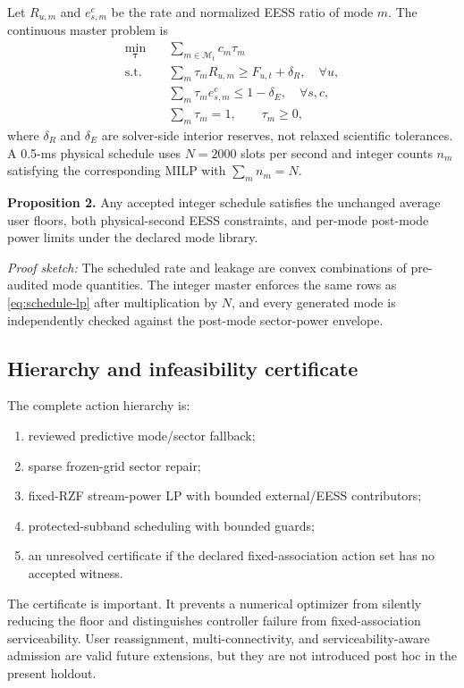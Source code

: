 \documentclass[journal]{IEEEtran}
\newcommand{\M}{\mathcal{M}}
\begin{document}
Let $R_{u,m}$ and $e^{c}_{s,m}$ be the rate and normalized EESS ratio of mode $m$. The continuous master problem is
\begin{subequations}
\begin{align}
 \min_{\bm\tau}\quad &\sum_{m\in\M_t}c_m\tau_m\\
 \text{s.t.}\quad
 &\sum_m\tau_m R_{u,m}\ge F_{u,t}+\delta_R,\quad \forall u,\\
 &\sum_m\tau_m e^{c}_{s,m}\le 1-\delta_E,\quad \forall s,c,\\
 &\sum_m\tau_m=1,\qquad \tau_m\ge0,
\end{align}
\label{eq:schedule-lp}
\end{subequations}
where $\delta_R$ and $\delta_E$ are solver-side interior reserves, not relaxed scientific tolerances. A 0.5-ms physical schedule uses $N=2000$ slots per second and integer counts $n_m$ satisfying the corresponding MILP with $\sum_m n_m=N$.

\textbf{Proposition 2.} Any accepted integer schedule satisfies the unchanged average user floors, both physical-second EESS constraints, and per-mode post-mode power limits under the declared mode library.

\emph{Proof sketch:} The scheduled rate and leakage are convex combinations of pre-audited mode quantities. The integer master enforces the same rows as \eqref{eq:schedule-lp} after multiplication by $N$, and every generated mode is independently checked against the post-mode sector-power envelope.

\subsection{Hierarchy and infeasibility certificate}
The complete action hierarchy is:
\begin{enumerate}
\item reviewed predictive mode/sector fallback;
\item sparse frozen-grid sector repair;
\item fixed-RZF stream-power LP with bounded external/EESS contributors;
\item protected-subband scheduling with bounded guards;
\item an unresolved certificate if the declared fixed-association action set has no accepted witness.
\end{enumerate}
The certificate is important. It prevents a numerical optimizer from silently reducing the floor and distinguishes controller failure from fixed-association serviceability. User reassignment, multi-connectivity, and serviceability-aware admission are valid future extensions, but they are not introduced post hoc in the present holdout.
\end{document}

